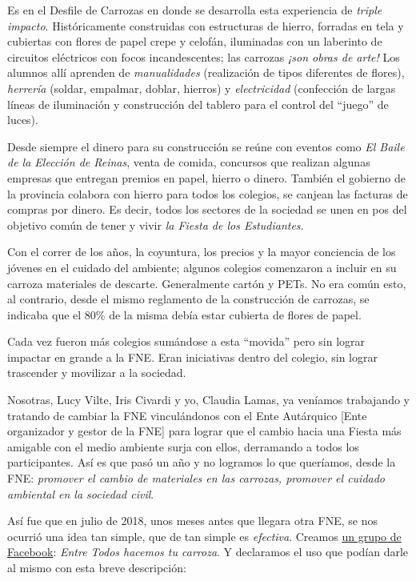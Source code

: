 \documentclass[]{article}
\begin{document}
Es en el Desfile de Carrozas en donde se desarrolla esta experiencia de
\emph{triple impacto}. Históricamente construidas con estructuras de
hierro, forradas en tela y cubiertas con flores de papel crepe y
celofán, iluminadas con un laberinto de circuitos eléctricos con focos
incandescentes; las carrozas \emph{¡son obras de arte!} Los alumnos allí
aprenden de \emph{manualidades} (realización de tipos diferentes de
flores), \emph{herrería} (soldar, empalmar, doblar, hierros) y
\emph{electricidad} (confección de largas líneas de iluminación y
construcción del tablero para el control del ``juego'' de luces).

Desde siempre el dinero para su construcción se reúne con eventos como
\emph{El Baile de la Elección de Reinas}, venta de comida, concursos que
realizan algunas empresas que entregan premios en papel, hierro o
dinero. También el gobierno de la provincia colabora con hierro para
todos los colegios, se canjean las facturas de compras por dinero. Es
decir, todos los sectores de la sociedad se unen en pos del objetivo
común de tener y vivir \emph{la Fiesta de los Estudiantes}.

Con el correr de los años, la coyuntura, los precios y la mayor
conciencia de los jóvenes en el cuidado del ambiente; algunos colegios
comenzaron a incluir en su carroza materiales de descarte. Generalmente
cartón y PETs. No era común esto, al contrario, desde el mismo
reglamento de la construcción de carrozas, se indicaba que el 80\% de la
misma debía estar cubierta de flores de papel.

Cada vez fueron más colegios sumándose a esta ``movida'' pero sin lograr
impactar en grande a la FNE. Eran iniciativas dentro del colegio, sin
lograr trascender y movilizar a la sociedad.

Nosotras, Lucy Vilte, Iris Civardi y yo, Claudia Lamas, ya veníamos
trabajando y tratando de cambiar la FNE vinculándonos con el Ente
Autárquico {[}Ente organizador y gestor de la FNE{]} para lograr que el
cambio hacia una Fiesta más amigable con el medio ambiente surja con
ellos, derramando a todos los participantes. Así es que pasó un año y no
logramos lo que queríamos, desde la FNE: \emph{promover el cambio de
materiales en las carrozas, promover el cuidado ambiental en la sociedad
civil}.

Así fue que en julio de 2018, unos meses antes que llegara otra FNE, se
nos ocurrió una idea tan simple, que de tan simple es \emph{efectiva}.
Creamos \href{https://www.facebook.com/groups/234634360665192/}{un grupo
de Facebook}: \emph{Entre Todos hacemos tu carroza}. Y declaramos el uso
que podían darle al mismo con esta breve descripción:
\end{document}
